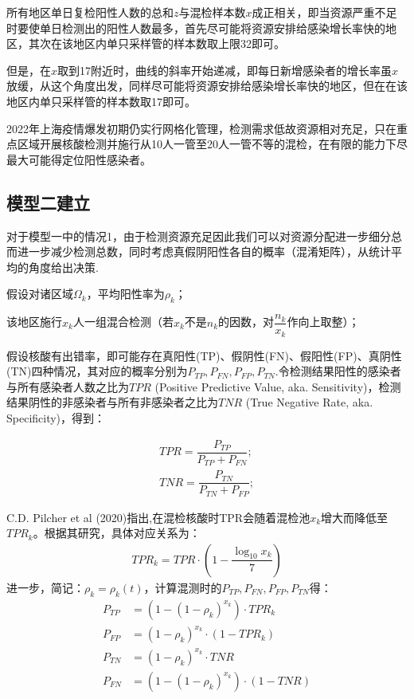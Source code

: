 \documentclass[withoutpreface,bwprint]{cumcmthesis} %
\begin{document}
所有地区单日复检阳性人数的总和$z$与混检样本数$x$成正相关，即当资源严重不足时要使单日检测出的阳性人数最多，首先尽可能将资源安排给感染增长率快的地区，其次在该地区内单只采样管的样本数取上限32即可。

但是，在$x$取到17附近时，曲线的斜率开始递减，即每日新增感染者的增长率虽$x$放缓，从这个角度出发，同样尽可能将资源安排给感染增长率快的地区，但在在该地区内单只采样管的样本数取17即可。

2022年上海疫情爆发初期仍实行网格化管理，检测需求低故资源相对充足，只在重点区域开展核酸检测并施行从10人一管至20人一管不等的混检，在有限的能力下尽最大可能得定位阳性感染者。

\subsection{模型二建立}
对于模型一中的情况1，由于检测资源充足因此我们可以对资源分配进一步细分总而进一步减少检测总数，同时考虑真假阴阳性各自的概率（混淆矩阵），从统计平均的角度给出决策.


假设对诸区域$\Omega_k$，平均阳性率为$\rho_k$；

该地区施行$x_k$人一组混合检测（若$x_k$不是$n_k$的因数，对$\dfrac{n_k}{x_k}$作向上取整）；

假设核酸有出错率，即可能存在真阳性(TP)、假阴性(FN)、假阳性(FP)、真阴性(TN)四种情况，其对应的概率分别为$P_{TP},P_{FN},P_{FP},P_{TN}$.令检测结果阳性的感染者与所有感染者人数之比为$TPR$ (Positive Predictive Value, aka. Sensitivity)，检测结果阴性的非感染者与所有非感染者之比为$TNR$ (True Negative Rate, aka. Specificity)，得到：

\begin{align}
\label{TPR}
    TPR=\dfrac{P_{TP}}{P_{TP}+P_{FN}};  \\
    TNR=\dfrac{P_{TN}}{P_{TN}+P_{FP}};  
\end{align}

C.D. Pilcher et al (2020)\cite{CDP}指出,在混检核酸时TPR会随着混检池$x_k$增大而降低至$TPR_k$。根据其研究，具体对应关系为：
\begin{align}
    TPR_k=TPR\cdot (1-\dfrac{\log_{10}x_k}{7})
\end{align}
进一步，简记：$\rho_k =\rho_k(t)$，计算混测时的$P_{TP},P_{FN},P_{FP},P_{TN}$得：
\begin{align}
    P_{TP}&=(1-(1-\rho_k)^{x_k})\cdot TPR_k\\
    P_{FP}&=(1-\rho_k)^{x_k}\cdot(1-TPR_k)\\
    P_{TN}&=(1-\rho_k)^{x_k}\cdot TNR\\
    P_{FN}&=(1-(1-\rho_k)^{x_k})\cdot (1-TNR)
    \label{FN}
\end{align}
\end{document}
